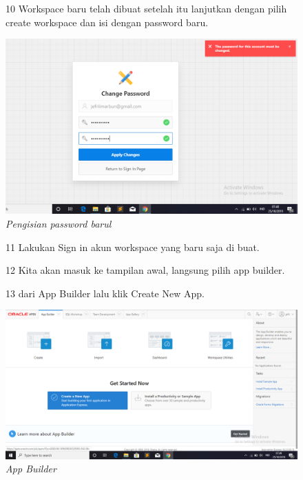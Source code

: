 \begin{enumerate}
\begin{figure}
\item[10] Workspace baru telah dibuat setelah itu lanjutkan dengan pilih create workspace dan isi dengan password baru.

    \begin{center}
\includegraphics[scale=0.5]{apex/apex5.png}
    \caption{\textit{Pengisian password barul}}
        \end{center}
\label{gambar}
\end{figure}

\begin{figure}
\item[11] Lakukan Sign in akun workspace yang baru saja di buat.

\end{figure}

\begin{figure}
\item[12] Kita akan masuk ke tampilan awal, langsung pilih app builder.

    
\end{figure}

\begin{figure}
\item[13] dari App Builder lalu klik Create New App.

    \begin{center}
\includegraphics[scale=0.4]{apex/apex6.png}
    \caption{\textit{App Builder}}
        \end{center}
\label{gambar}
\end{figure}


\end{enumerate}
